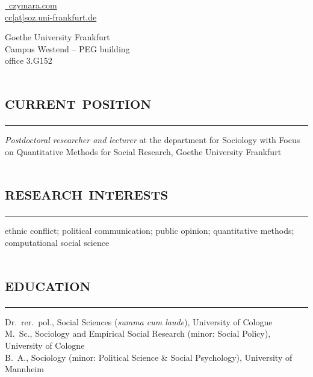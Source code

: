 \documentclass[11pt, a4paper]{article}
\title{}
\newcommand{\years}[1]{\marginnote{~~#1}}
\begin{document}
\author{\huge \textsc{Dr. Christian S. Czymara}}
\date{}
\maketitle
\begin{minipage}{0.5\textwidth}
\href{https://czymara.com}{\faLaptop~czymara.com}\\
\href{mailto:cc@soz.uni-frankfurt.de}{ cc[at]soz.uni-frankfurt.de}\\
\href{https://scholar.google.de/citations?user=khPqHmgAAAAJ}{\faGoogle} \href{https://github.com/czymara/}{\faGithub} \href{https://methodenderqu-ujz7851.slack.com/team/U010X1DBKMG}{\textcolor[rgb]{0,0,1}{\faSlack}} \href{https://twitter.com/cczymara}{\faTwitter}
\end{minipage}
\begin{minipage}{0.5\textwidth}
\begin{flushright}
Goethe University Frankfurt\\
Campus Westend -- PEG building\\
office 3.G152
\end{flushright}
\end{minipage}
\section*{\textsc{current position}}
\vskip-20pt{\noindent\rule{\textwidth}{1pt}}
\years{since 05/18}\textit{Postdoctoral researcher and lecturer} at the department for Sociology with Focus on Quantitative Methods for Social Research, Goethe University Frankfurt
\section*{\textsc{research interests}}
\vskip-20pt{\noindent\rule{\textwidth}{1pt}}
ethnic conflict; political communication; public opinion; quantitative methods; computational social science
\section*{\textsc{education}}
\vskip-20pt{\noindent\rule{\textwidth}{1pt}}
\noindent
\years{12/18}Dr.~rer.~pol., Social Sciences (\textit{summa cum laude}), University of Cologne\\
\years{08/15}M.~Sc., Sociology and Empirical Social Research (minor: Social Policy), University of Cologne\\
\years{06/12}B.~A., Sociology (minor: Political Science \& Social Psychology), University of Mannheim
\end{document}
